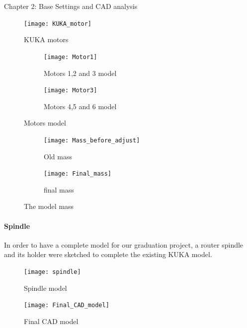 \documentclass{book}
\begin{document}
\begin{chapter}{Chapter 2: Base Settings and CAD analysis}
\begin{figure}[H]
	\centering
	\texttt{[image: KUKA\_motor]}
	\caption{KUKA motors}
\end{figure}

\begin{figure}[H]
	\begin{subfigure}{0.5\textwidth}
		\centering
		\texttt{[image: Motor1]}
		\caption{Motors 1,2 and 3 model}
		\label{fig:sfig1}
	\end{subfigure}%
	\begin{subfigure}{0.5\textheight}
		
		\centering
		\texttt{[image: Motor3]}
		\caption{Motors 4,5 and 6 model}
		\label{fig:sfig2}
	\end{subfigure}
	\caption{Motors model}
	\label{fig:fig}
\end{figure}

\begin{figure}[H]
	\begin{subfigure}{0.6\textwidth}
		\centering
		\texttt{[image: Mass\_before\_adjust]}
		\caption{Old mass}
		\label{fig:sfig1}
	\end{subfigure}%
	\begin{subfigure}{0.5\textheight}
		\centering
		\texttt{[image: Final\_mass]}
		\caption{final mass}
		\label{fig:sfig2}
	\end{subfigure}
	\caption{The model mass}
	\label{fig:fig}
\end{figure}

\paragraph{Spindle}
In order to have a complete model for our graduation project, a router spindle and its holder were sketched to complete the existing KUKA model.

\begin{figure}[H]
	\centering
	\texttt{[image: spindle]}
	\caption{Spindle model}
\end{figure}

\begin{figure}[H]
	\centering
	\texttt{[image: Final\_CAD\_model]}
	\caption{Final CAD model}
\end{figure}


\end{chapter}
\end{document}

